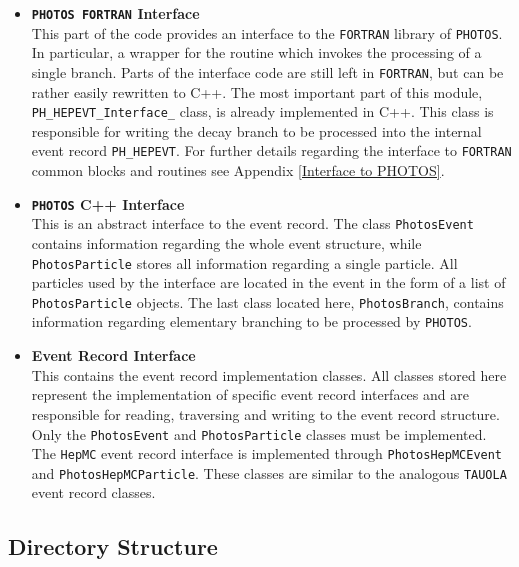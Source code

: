 \documentclass[]{Photos_interface_design}
\begin{document}
\begin{itemize}
  \item {\bf {\tt PHOTOS FORTRAN} Interface}\\
       This part of the code provides an interface 
       to the {\tt FORTRAN} library of {\tt PHOTOS}. In particular,
	   a wrapper for the routine which invokes the processing
	   of a single branch. Parts of the interface code are still left in {\tt FORTRAN}, but
	   can be rather easily rewritten to C++. 
       The most important part of this module, {\tt PH\_HEPEVT\_Interface\_} class,
       is already implemented  in C++. This class is responsible for writing
	   the decay branch to be processed into the internal event record {\tt PH\_HEPEVT}.
       For further details regarding the interface to {\tt FORTRAN}
	   common blocks and routines see Appendix \ref{Interface to PHOTOS}.
  \item {\bf {\tt PHOTOS} C++ Interface} \\
       This is an abstract interface to the event record.
       The class {\tt PhotosEvent} contains information regarding the whole event
       structure, while {\tt PhotosParticle} stores all information regarding a single particle.
       All particles used by the interface are located in the event in the form of
       a list of {\tt PhotosParticle} objects.
       The last class located here, {\tt PhotosBranch}, contains information regarding
	 elementary branching to be processed by {\tt PHOTOS}.
  \item {\bf Event Record Interface} \\
       This contains the event record implementation classes. All classes stored here represent
       the implementation of specific event record interfaces and are responsible for reading,
       traversing and writing to the event record structure.
       Only the {\tt PhotosEvent} and {\tt PhotosParticle} classes must be implemented.
       The {\tt HepMC} event record interface is implemented
       through {\tt PhotosHepMCEvent} and {\tt PhotosHepMCParticle}. These classes are similar to the
       analogous {\tt TAUOLA} \cite{Davidson:2010rw} event record classes.
\end{itemize}

\subsection{Directory Structure}
\end{document}
